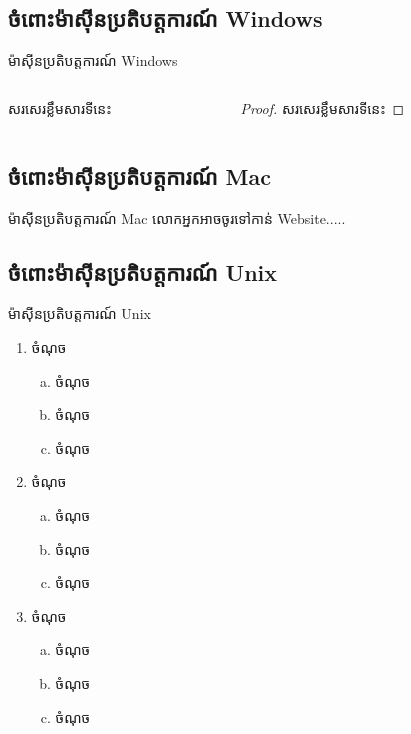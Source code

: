 \documentclass{beamer}
\begin{document}
		\subsection{ចំពោះម៉ាស៊ីនប្រតិបត្តការណ៍ Windows}
		\begin{frame}{ម៉ាស៊ីនប្រតិបត្តការណ៍ Windows}
			\begin{columns}
				\begin{column}{0.47\textwidth}
					\begin{theorem}
						សរសេរខ្លឹមសារទីនេះ
					\end{theorem}
				\end{column}
				\begin{column}{0.47\textwidth}
					\begin{proof}
						សរសេរខ្លឹមសារទីនេះ
					\end{proof}
				\end{column}
			\end{columns}
		\end{frame}
	\subsection{ចំពោះម៉ាស៊ីនប្រតិបត្តការណ៍ Mac}
		\begin{frame}{ម៉ាស៊ីនប្រតិបត្តការណ៍ Mac}
			លោកអ្នកអាចចូរទៅកាន់ Website​.....
		\end{frame}
	\subsection{ចំពោះម៉ាស៊ីនប្រតិបត្តការណ៍ Unix}
		\begin{frame}{ម៉ាស៊ីនប្រតិបត្តការណ៍ Unix}
			\begin{enumerate}
				\item ចំណុច
			\begin{enumerate}[a)]
				\item ចំណុច
				\item ចំណុច
				\item ចំណុច
			\end{enumerate}
			\item ចំណុច
			\begin{enumerate}[a)]
				\item ចំណុច
				\item ចំណុច
				\item ចំណុច
			\end{enumerate}
			\item ចំណុច
			\begin{enumerate}[a)]
				\item ចំណុច
				\item ចំណុច
				\item ចំណុច
			\end{enumerate}
		\end{enumerate}
	\end{frame}
\end{document}
